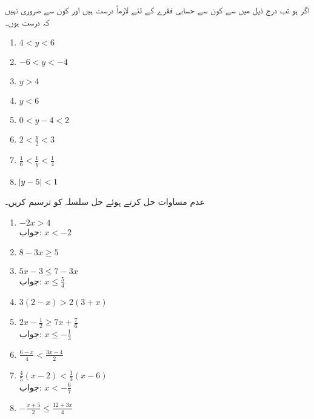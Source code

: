 اگر  ہو تب درج ذیل  میں سے کون سے حسابی فقرے  کے لئے لازماً درست ہیں اور کون سے ضروری نہیں کہ درست ہوں۔
\begin{multicols}{3}
\begin{enumerate}[a]
\item
$4<y<6$
\item
$-6<y<-4$
\item
$y>4$
\item
$y<6$
\item
$0<y-4<2$
\item
$2<\frac{y}{2}<3$
\item
$\frac{1}{6}<\frac{1}{y}<\frac{1}{4}$
\item
$\abs{y-5}<1$
\end{enumerate}
\end{multicols} 
عدم مساوات حل کرتے ہوئے حل سلسلہ کو ترسیم کریں۔
\begin{multicols}{2}
\begin{enumerate}[]
\item
{}
$-2x>4$\\
جواب:\quad 
$x<-2$
\item
{}
$8-3x\ge 5$
\item
{}
$5x-3\le 7-3x$\\
جواب:\quad
$x\le \tfrac{5}{4}$
\item
{}
$3(2-x)>2(3+x)$
\item
{}
$2x-\frac{1}{2}\ge 7x+\frac{7}{6}$\\
جواب:\quad 
$x\le -\tfrac{1}{3}$
\item
{}
$\frac{6-x}{4}<\frac{3x-4}{2}$
\item
{}
$\frac{4}{5}(x-2)<\frac{1}{3}(x-6)$\\
جواب:\quad
$x<-\tfrac{6}{7}$
\item
{}
$-\frac{x+5}{2}\le \frac{12+3x}{4}$
\end{enumerate}
\end{multicols}

